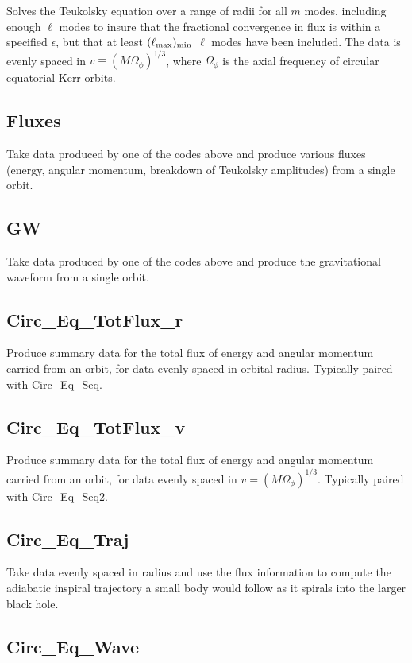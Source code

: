 \documentclass[11pt]{article}
\begin{document}
Solves the Teukolsky equation over a range of radii for all $m$ modes, including enough $\ell$ modes to insure that the fractional convergence in flux is within a specified $\epsilon$, but that at least $(\ell_{\rm max})_{\rm min}$ $\ell$ modes have been included.  The data is evenly spaced in $v \equiv (M\Omega_\phi)^{1/3}$, where $\Omega_\phi$ is the axial frequency of circular equatorial Kerr orbits.

\subsection{Fluxes}

Take data produced by one of the codes above and produce various fluxes (energy, angular momentum, breakdown of Teukolsky amplitudes) from a single orbit.

\subsection{GW}

Take data produced by one of the codes above and produce the gravitational waveform from a single orbit.

\subsection{Circ\_Eq\_TotFlux\_r}

Produce summary data for the total flux of energy and angular momentum carried from an orbit, for data evenly spaced in orbital radius.  Typically paired with Circ\_Eq\_Seq.

\subsection{Circ\_Eq\_TotFlux\_v}

Produce summary data for the total flux of energy and angular momentum carried from an orbit, for data evenly spaced in $v = (M\Omega_\phi)^{1/3}$.  Typically paired with Circ\_Eq\_Seq2.

\subsection{Circ\_Eq\_Traj}

Take data evenly spaced in radius and use the flux information to compute the adiabatic inspiral trajectory a small body would follow as it spirals into the larger black hole.

\subsection{Circ\_Eq\_Wave}
\end{document}
